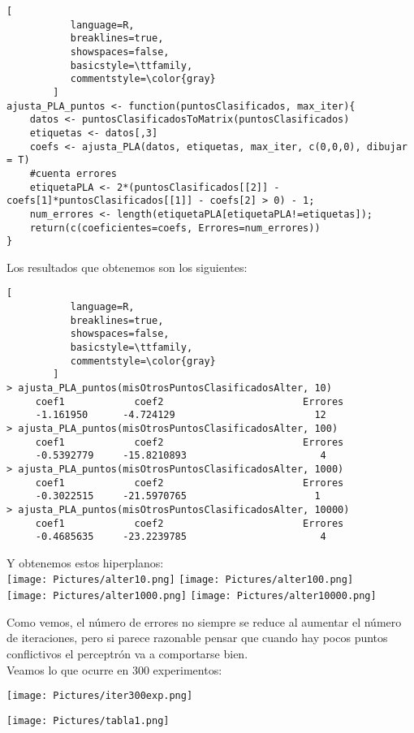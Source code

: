 \documentclass[11pt,fleqn]{book} %
\begin{document}
\begin{lstlisting}[
           language=R,
           breaklines=true,
           showspaces=false,
           basicstyle=\ttfamily,
           commentstyle=\color{gray}
        ]
ajusta_PLA_puntos <- function(puntosClasificados, max_iter){
    datos <- puntosClasificadosToMatrix(puntosClasificados)
    etiquetas <- datos[,3]
    coefs <- ajusta_PLA(datos, etiquetas, max_iter, c(0,0,0), dibujar = T)
    #cuenta errores
    etiquetaPLA <- 2*(puntosClasificados[[2]] - coefs[1]*puntosClasificados[[1]] - coefs[2] > 0) - 1;
    num_errores <- length(etiquetaPLA[etiquetaPLA!=etiquetas]);
    return(c(coeficientes=coefs, Errores=num_errores))
}
\end{lstlisting}
Los resultados que obtenemos son los siguientes:
\begin{lstlisting}[
           language=R,
           breaklines=true,
           showspaces=false,
           basicstyle=\ttfamily,
           commentstyle=\color{gray}
        ]
> ajusta_PLA_puntos(misOtrosPuntosClasificadosAlter, 10)
     coef1            coef2                        Errores 
     -1.161950      -4.724129                        12
> ajusta_PLA_puntos(misOtrosPuntosClasificadosAlter, 100)
     coef1            coef2                        Errores 
     -0.5392779     -15.8210893                       4
> ajusta_PLA_puntos(misOtrosPuntosClasificadosAlter, 1000)
     coef1            coef2                        Errores 
     -0.3022515     -21.5970765  					 1
> ajusta_PLA_puntos(misOtrosPuntosClasificadosAlter, 10000)
     coef1            coef2                        Errores 
     -0.4685635     -23.2239785                       4     
\end{lstlisting}
Y obtenemos estos hiperplanos:\\
\texttt{[image: Pictures/alter10.png]}
\texttt{[image: Pictures/alter100.png]}\\
\texttt{[image: Pictures/alter1000.png]}
\texttt{[image: Pictures/alter10000.png]}

Como vemos, el número de errores no siempre se reduce al aumentar el número de iteraciones, pero si parece razonable pensar que cuando hay pocos puntos conflictivos el perceptrón va a comportarse bien.\\
Veamos lo que ocurre en 300 experimentos:\\
\begin{multicols}{2} 
\texttt{[image: Pictures/iter300exp.png]}

\;

\;

\;

\begin{center}
\texttt{[image: Pictures/tabla1.png]}
\end{center}
\end{multicols} 
\end{document}
